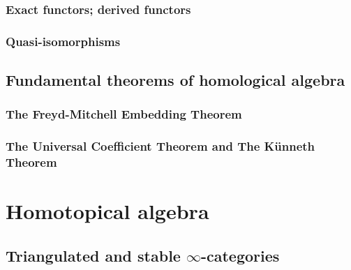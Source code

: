             \subsubsection{Exact functors; derived functors}
            
            \subsubsection{Quasi-isomorphisms}
        
        \subsection{Fundamental theorems of homological algebra}
            \subsubsection{The Freyd-Mitchell Embedding Theorem}
            
            \subsubsection{The Universal Coefficient Theorem and The K\"unneth Theorem}
    
    \section{Homotopical algebra} \label{section: homotopical_algebra}
        \subsection{Triangulated and stable \texorpdfstring{$\infty$}{}-categories}
